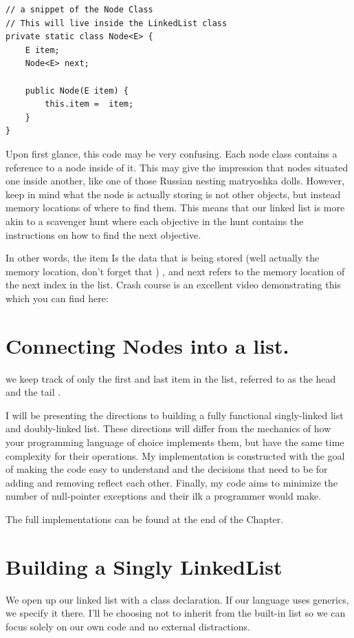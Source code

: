 \documentclass[10pt,a4paper]{book}
\begin{document}
\begin{verbatim}
// a snippet of the Node Class
// This will live inside the LinkedList class
private static class Node<E> {
	E item;
	Node<E> next;
	
	public Node(E item) {
		this.item =  item;
	}
} 
\end{verbatim}
Upon first glance, this code may be very confusing. Each node class contains a reference to a node inside of it.  This may give the impression that nodes  situated one inside another, like one of those Russian nesting matryoshka dolls.  
However, keep in mind what the node is actually storing is not other objects, but instead memory locations of where to find them.
This means that our linked list is more akin to a scavenger hunt where each objective in the hunt contains the instructions on how to find the next objective.

In other words, the item Is the data that is being stored (well actually the memory location, don't forget that ) , and next refers to the memory location of the next index in the list.  Crash course is an excellent video demonstrating this which you can find here: %


\section{Connecting Nodes into a list.}





we keep track of only the first and last item in the list, referred to as the head and the tail . 


I will be presenting the directions to building a fully functional  singly-linked list and doubly-linked list.  
These directions will differ from the mechanics of how your programming language of choice implements them, but have the same time complexity for their operations.
My implementation is constructed with the goal of making the code easy to understand and the decisions that need to be for adding and removing reflect each other.
Finally, my code aims to minimize the number of null-pointer exceptions and their ilk a programmer would make.

The full implementations can be found at the end of the Chapter.

\section{Building a Singly LinkedList}
We open up our linked list with a class declaration. 
If our language uses generics, we specify it there.
I'll be choosing not to inherit from the built-in list so we can focus solely on our own code and no external distractions.
\end{document}
